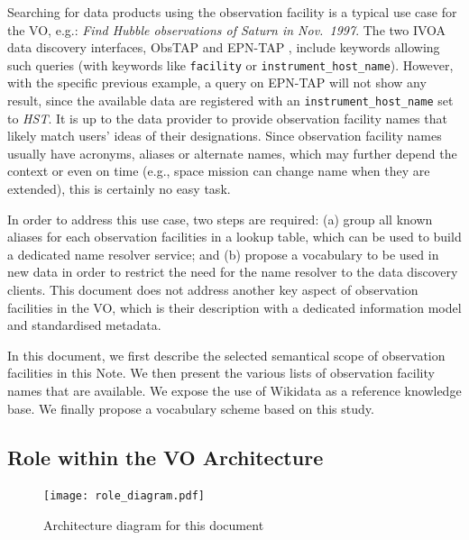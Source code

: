 \documentclass[11pt,a4paper]{ivoa}
\begin{document}
Searching for data products using the observation facility is a
typical use case for the VO, e.g.: \emph{Find Hubble observations
of Saturn in Nov.\ 1997}. The two IVOA data discovery interfaces,
ObsTAP \citep{2017ivoa.spec.0509L} and EPN-TAP \citep{ivoa:epntap},
include keywords allowing such queries (with keywords like
\texttt{facility} or \texttt{instrument\_host\_name}). However, with
the specific previous example, a query on EPN-TAP will not show any
result, since the available data are registered with an
\texttt{instrument\_host\_name} set to \emph{HST}. It is up to the
data provider to provide observation facility names that likely match
users' ideas of their designations.  Since
observation facility names usually have acronyms, aliases or alternate
names, which may further depend the context or even on
time (e.g., space mission can change name when they are extended), this
is certainly no easy task.

In order to address this use case, two steps are required: (a) group
all known aliases for each observation facilities in a lookup table,
which can be used to build a dedicated name resolver service; and
(b) propose a vocabulary to be used in new data in order to restrict the
need for the name resolver to the data discovery clients.
This document does not address another key
aspect of observation facilities in the VO, which is their
description with a dedicated information model and standardised
metadata.

In this document, we first describe the selected semantical scope of
observation facilities in this Note. We then present the various
lists of observation facility names that are available. We expose the
use of Wikidata as a reference knowledge base. We finally propose a
vocabulary scheme based on this study.

\subsection{Role within the VO Architecture}

\begin{figure}
\centering


\texttt{[image: role\_diagram.pdf]}
\caption{Architecture diagram for this document}
\label{fig:archdiag}
\end{figure}
\end{document}
